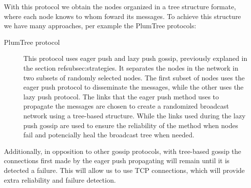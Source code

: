 With this protocol we obtain the nodes organized in a tree structure formate, where each node
knows to whom foward its messages. To achieve this structure we have many approaches,
per example the PlumTree protocols:
\begin{description}
    \item[PlumTree protocol] This protocol uses eager push and lazy push gossip, previously explaned in
        the section ref{subsec:strategies}. It separates the nodes in the network in
        two subsets of randomly selected nodes. The first subset of nodes uses the eager push
        protocol to disseminate the messages, while the other uses the lazy push protocol. The
        links that the eager push method uses to propagate the messages are chosen to create
        a randomized broadcast network using a tree-based structure. While the links used
        during the lazy push gossip are used to ensure the reliability of the method when
        nodes fail and potencially heal the broadcast tree when needed\cite{Leitao2007Tree}.
\end{description}

Additionally, in opposition to other gossip protocols, with tree-based gossip the connections
first made by the eager push propagating will remain until it is detected a failure. This will
allow us to use TCP connections, which will provide extra reliability and failure detection.

